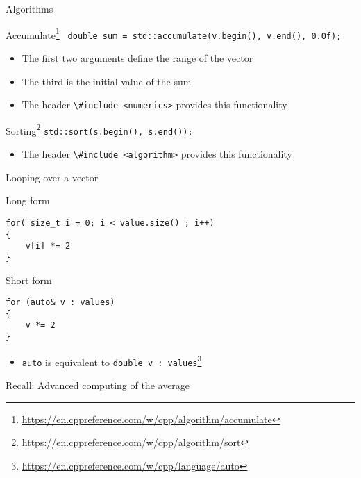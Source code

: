 \documentclass[12pt]{beamer}
\begin{document}
\begin{frame}{Algorithms}

\begin{block}{Accumulate\footnote{\tiny\url{https://en.cppreference.com/w/cpp/algorithm/accumulate}}}
\lstinline| double sum = std::accumulate(v.begin(), v.end(), 0.0f); |
\begin{itemize}
\item The first two arguments define the range of the vector
\item The third is the initial value of the sum 
\item The header \lstinline|\#include <numerics>| provides this functionality
\end{itemize}
\end{block}

\begin{block}{Sorting\footnote{\tiny\url{https://en.cppreference.com/w/cpp/algorithm/sort}}}
\lstinline|std::sort(s.begin(), s.end());|
\begin{itemize}
\item The header \lstinline|\#include <algorithm>| provides this functionality
\end{itemize}
\end{block}

\end{frame}

\begin{frame}[fragile]{Looping over a vector}

\begin{block}{Long form}
\begin{lstlisting}
for( size_t i = 0; i < value.size() ; i++)
{
	v[i] *= 2
}
\end{lstlisting}
\end{block}


\begin{block}{Short form}
\begin{lstlisting}
for (auto& v : values)
{
	v *= 2
}
\end{lstlisting}
\end{block}
\begin{itemize}
\item \lstinline|auto| is equivalent to \lstinline|double v : values|\footnote{\tiny\url{https://en.cppreference.com/w/cpp/language/auto}} 
\end{itemize}

\end{frame}

\begin{frame}{Recall: Advanced computing of the average}



\end{frame}
\end{document}
